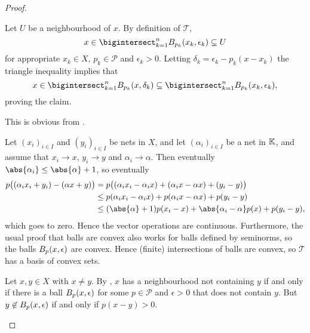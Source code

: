 \documentclass[article, a4paper, 11pt, oneside]{memoir}
\numberwithin{equation}{chapter}
\newcommand{\calT}{\mathcal{T}}
\newcommand{\calP}{\mathcal{P}}
\begin{document}
\begin{proof}
\begin{proofsec}
    \item[Proof of \subcref{enum:LCS-nhood-basis}]
    Let $U$ be a neighbourhood of $x$. By definition of $\calT$,
    \begin{equation*}
        x
            \in \bigintersect_{k=1}^n \ball[p_k]{x_k}{\epsilon_k}
            \subseteq U
    \end{equation*}
    for appropriate $x_k \in X$, $p_k \in \calP$ and $\epsilon_k > 0$. Letting $\delta_k = \epsilon_k - p_k(x - x_k)$ the triangle inequality implies that
    \begin{equation*}
        x
            \in \bigintersect_{k=1}^n \ball[p_k]{x}{\delta_k}
            \subseteq \bigintersect_{k=1}^n \ball[p_k]{x_k}{\epsilon_k},
    \end{equation*}
    proving the claim.

    \item[Proof of \subcref{enum:LCS-net-convergence}]
    This is obvious from .

    \item[Proof of \subcref{enum:seminorm-topology-is-LCS}]
    Let $(x_i)_{i \in I}$ and $(y_i)_{i \in I}$ be nets in $X$, and let $(\alpha_i)_{i \in I}$ be a net in $\field$, and assume that $x_i \to x$, $y_i \to y$ and $\alpha_i \to \alpha$. Then eventually $\abs{\alpha_i} \leq \abs{\alpha} + 1$, so eventually
    \begin{align*}
        p\bigl( (\alpha_i x_i + y_i) - (\alpha x + y) \bigr)
            &= p\bigl( (\alpha_i x_i - \alpha_i x) + (\alpha_i x - \alpha x) + (y_i - y) \bigr) \\
            &\leq p(\alpha_i x_i - \alpha_i x) + p(\alpha_i x - \alpha x) + p(y_i - y) \\
            &\leq (\abs{\alpha} + 1) p(x_i - x) + \abs{\alpha_i - \alpha} p(x) + p(y_i - y),
    \end{align*}
    which goes to zero. Hence the vector operations are continuous. Furthermore, the usual proof that balls are convex also works for balls defined by seminorms, so the balls $\ball[p]{x}{\epsilon}$ are convex. Hence (finite) intersections of balls are convex, so $\calT$ has a basis of convex sets.

    \item[Proof of \subcref{enum:seminorm-topology-separating}]
    Let $x,y \in X$ with $x \neq y$. By , $x$ has a neighbourhood not containing $y$ if and only if there is a ball $\ball[p]{x}{\epsilon}$ for some $p \in \calP$ and $\epsilon > 0$ that does not contain $y$. But $y \not\in \ball[p]{x}{\epsilon}$ if and only if $p(x-y) > 0$.
\end{proofsec}
\end{proof}
\end{document}
